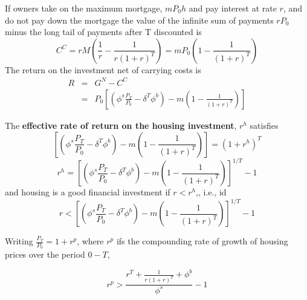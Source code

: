 \documentclass[11pt]{amsart}
\begin{document}
If  owners take on the maximum mortgage, $mP_0h$ and pay interest at rate $r$, %
and do not pay down the mortgage the value of the infinite sum of payments $ rP_0$  minus the long tail of payments after T discounted is 
\[C^C= rM\left(\frac{1}{r} - \frac{1}{r(1+r)^T}\right)= mP_0\left(1- \frac{1}{(1+r)^T}\right) \]%
The return on the investment net of carrying costs is 
\begin{eqnarray}
R&=&G^N-C^C \\
&=&P_0\left[ \left(\phi^s \frac{P_T}{P_0}-\delta^T\phi^b\right)      -m\left(1- \frac{1}{(1+r)^T}\right) \right]
\end{eqnarray}


The \textbf{effective rate of  return on the housing investment}, $r^h$ satisfies 
\[\left[ \left(\phi^s \frac{P_T}{P_0}-\delta^T\phi^b\right)      -m\left(1- \frac{1}{(1+r)^T}\right) \right]=(1+r^h)^T\]
\[r^h=\left[ \left(\phi^s \frac{P_T}{P_0}-\delta^T\phi^b\right)      -m\left(1- \frac{1}{(1+r)^T}\right) \right]^{1/T}-1\]
and housing is a good financial investment if $r<r^h$,, i.e., id
\[r< \left[ \left(\phi^s \frac{P_T}{P_0}-\delta^T\phi^b\right)      -m\left(1- \frac{1}{(1+r)^T}\right) \right]^{1/T}-1\]

Writing $\frac{P_T}{P_0}= 1+r^p$, where $r^p$ ifs the compounding rate of growth of housing prices over the period $0-T$,  

\[r^p>\frac{r^T+ \frac{1}{r(1+r)^T}+\phi^b}{\phi^s}-1\]
\end{document}
